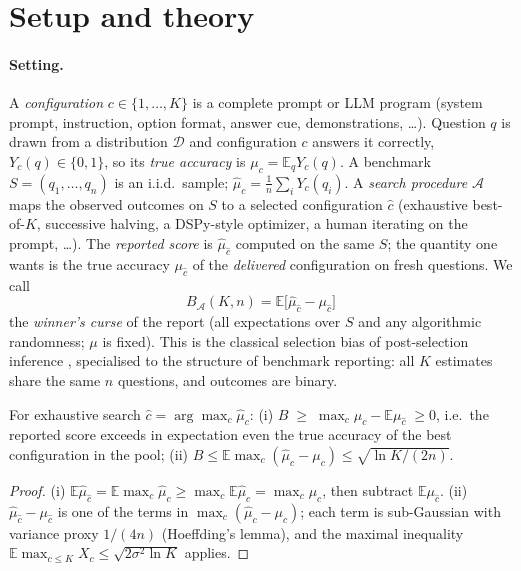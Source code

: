 \section{Setup and theory}\label{sec:theory}

\paragraph{Setting.}
A \emph{configuration} $c\in\{1,\dots,K\}$ is a complete prompt or LLM program (system prompt, instruction, option format, answer cue, demonstrations, \dots).
Question $q$ is drawn from a distribution $\mathcal D$ and configuration $c$ answers it correctly, $Y_c(q)\in\{0,1\}$, so its \emph{true accuracy} is $\mu_c=\mathbb E_q Y_c(q)$.
A benchmark $S=(q_1,\dots,q_n)$ is an i.i.d.\ sample; $\hat\mu_c=\frac1n\sum_i Y_c(q_i)$.
A \emph{search procedure} $\mathcal A$ maps the observed outcomes on $S$ to a selected configuration $\hat c$ (exhaustive best-of-$K$, successive halving, a DSPy-style optimizer, a human iterating on the prompt, \dots).
The \emph{reported score} is $\hat\mu_{\hat c}$ computed on the same $S$; the quantity one wants is the true accuracy $\mu_{\hat c}$ of the \emph{delivered} configuration on fresh questions.
We call
\begin{equation}
B_{\mathcal A}(K,n)=\mathbb E\big[\hat\mu_{\hat c}-\mu_{\hat c}\big]
\end{equation}
the \emph{winner's curse} of the report (all expectations over $S$ and any algorithmic randomness; $\mu$ is fixed).
This is the classical selection bias of post-selection inference \citep{berk2013valid,andrews2024inference}, specialised to the structure of benchmark reporting: all $K$ estimates share the same $n$ questions, and outcomes are binary.

\begin{proposition}\label{prop:bound}
For exhaustive search $\hat c=\arg\max_c\hat\mu_c$:
(i) $B\;\ge\;\max_c\mu_c-\mathbb E\mu_{\hat c}\;\ge 0$, i.e.\ the reported score exceeds in expectation even the true accuracy of the best configuration in the pool;
(ii) $B\le\mathbb E\max_c(\hat\mu_c-\mu_c)\le\sqrt{\ln K/(2n)}$.
\end{proposition}
\begin{proof}
(i) $\mathbb E\hat\mu_{\hat c}=\mathbb E\max_c\hat\mu_c\ge\max_c\mathbb E\hat\mu_c=\max_c\mu_c$, then subtract $\mathbb E\mu_{\hat c}$.
(ii) $\hat\mu_{\hat c}-\mu_{\hat c}$ is one of the terms in $\max_c(\hat\mu_c-\mu_c)$; each term is sub-Gaussian with variance proxy $1/(4n)$ (Hoeffding's lemma), and the maximal inequality $\mathbb E\max_{c\le K}X_c\le\sqrt{2\sigma^2\ln K}$ applies.
\end{proof}

